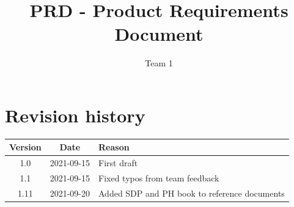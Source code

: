 \documentclass{article}
\title{PRD - Product Requirements Document}
\author{Team 1}
\begin{document}
\date{}
\maketitle
\thispagestyle{fancy}
\newpage

\tableofcontents

\section*{Revision history}
\begin{tabular}{ |c|c|l| } 
 \hline
 Version & Date & Reason \\ \hline
 1.0 & 2021-09-15 & First draft \\ 
 1.1 & 2021-09-15 & Fixed typos from team feedback \\ 
 1.11 & 2021-09-20 &  Added SDP and PH book to reference documents\\
 \hline
\end{tabular}

\newpage
\end{document}
